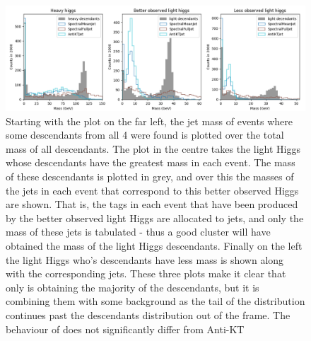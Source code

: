 \begin{figure}[htp]
    \includegraphics[width=1.\textwidth]{graphics/best_correct_h_allocation.png}
    \caption{Starting with the plot on the far left, the jet mass of events where
        some descendants from all 4  were found is plotted over
        the total mass of all descendants.
        The plot in the centre takes the light Higgs whose descendants have the greatest mass in each event.
        The mass of these descendants is plotted in grey, and over this
        the masses of the jets in each event that correspond to this better observed Higgs
        are shown.
        That is, the tags in each event that have been produced by the better observed light Higgs
        are allocated to jets, and only the mass of these jets is tabulated - thus
        a good cluster will have obtained the mass of the light Higgs descendants.
        Finally on the left the light Higgs who's descendants have less mass is shown along with
        the corresponding jets.
        These three plots make it clear that only \spectralfulljet{} is obtaining the majority of the
        descendants, but it is combining them with some background as the tail of the
       \spectralfulljet{} distribution continues past the descendants distribution
       out of the frame.
       The behaviour of \spectralmeanjet{} does not significantly differ from Anti-KT
    }\label{fig:best_correct_h_allocation}
\end{figure}    
